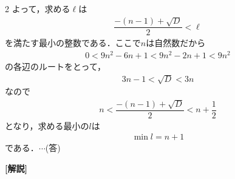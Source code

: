 \documentclass[../../main.tex]{subfiles}
\begin{document}
\begin{multicols}{2}
  よって，求める$\ell$は
  \begin{align}
    \dfrac{-(n-1)+\sqrt{D}}{2} < \ell
  \end{align}
  を満たす最小の整数である．ここで$n$は自然数だから
  \begin{align}
    0<9n^2-6n+1 < 9n^2-2n+1 < 9n^2
  \end{align}
  の各辺のルートをとって，
  \begin{align}
    3n-1 < \sqrt{D} < 3n
  \end{align}
  なので
  \begin{align}
    n < \dfrac{-(n-1)+\sqrt{D}}{2} < n+\dfrac{1}{2}
  \end{align}
  となり，求める最小の$l$は
  \begin{align}
    \min l = n+1
  \end{align}
  である．$\cdots$(答)

  {\bf [解説]}

  \newpage
\end{multicols}
\end{document}
